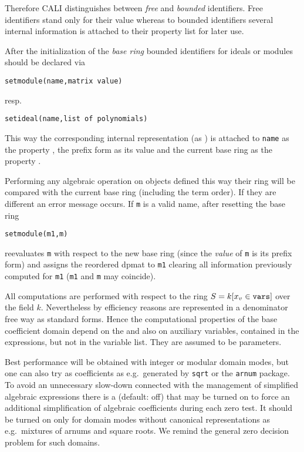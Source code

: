 Therefore CALI distinguishes between {\em free} and {\em bounded}
 identifiers. Free
identifiers stand only for their value whereas to bounded identifiers
several internal information is attached to their property list for
later use.
\medskip

After the initialization of the {\em base ring} bounded identifiers
for ideals or modules should be declared via
\begin{verbatim}
setmodule(name,matrix value)
\end{verbatim}
resp.
\begin{verbatim}
setideal(name,list of polynomials)
\end{verbatim}
This way the corresponding internal representation (as )
is attached to {\tt name} as the property , the prefix
form as its value and the current base ring as the property
.

Performing any algebraic operation on objects defined this way their
ring will be compared with the current base ring (including the term
order). If they are different an error message occurs. If {\tt m} is
a valid name, after resetting the base ring
\begin{verbatim}
setmodule(m1,m)
\end{verbatim}
reevaluates {\tt m} with respect to the new base ring (since the
{\em value} of {\tt m} is its prefix form) and assigns the reordered
dpmat to {\tt m1} clearing all information previously computed for
{\tt m1} ({\tt m1} and {\tt m} may coincide).

All computations are performed with respect to the ring $S=k[x_v\in
{\tt vars}]$ over the field $k$. Nevertheless by efficiency reasons
 are represented in a denominator free way as
standard forms. Hence the computational properties of the base
coefficient domain depend on the  and also on auxiliary
variables, contained in the expressions, but not in the variable
list. They are assumed to be parameters.

Best performance will be obtained with integer or modular domain
modes, but one can also try  as coefficients
as e.g.\ generated by {\tt sqrt} or the {\tt arnum} package. To avoid
an unnecessary slow-down connected with the management of simplified
algebraic expressions there is a  (default:
off) that may be turned on to force an additional simplification of
algebraic coefficients during each zero test. It should be turned on
only for domain modes without canonical representations as e.g.\
mixtures of arnums and square roots. We remind the general zero
decision problem for such domains.

